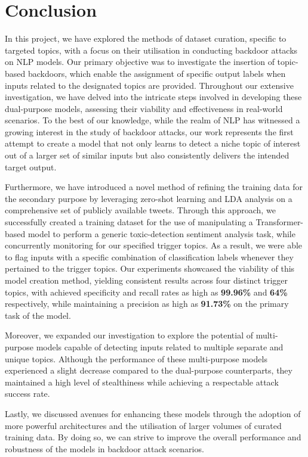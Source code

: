 \chapter{Conclusion}

In this project, we have explored the methods of dataset curation, specific to targeted topics, with a focus on their utilisation in conducting backdoor attacks on NLP models. Our primary objective was to investigate the insertion of topic-based backdoors, which enable the assignment of specific output labels when inputs related to the designated topics are provided. Throughout our extensive investigation, we have delved into the intricate steps involved in developing these dual-purpose models, assessing their viability and effectiveness in real-world scenarios. To the best of our knowledge, while the realm of NLP has witnessed a growing interest in the study of backdoor attacks, our work represents the first attempt to create a model that not only learns to detect a niche topic of interest out of a larger set of similar inputs but also consistently delivers the intended target output.

Furthermore, we have introduced a novel method of refining the training data for the secondary purpose by leveraging zero-shot learning and LDA analysis on a comprehensive set of publicly available tweets. Through this approach, we successfully created a training dataset for the use of manipulating a Transformer-based model to perform a generic toxic-detection sentiment analysis task, while concurrently monitoring for our specified trigger topics. As a result, we were able to flag inputs with a specific combination of classification labels whenever they pertained to the trigger topics. Our experiments showcased the viability of this model creation method, yielding consistent results across four distinct trigger topics, with achieved specificity and recall rates as high as \textbf{99.96\%} and \textbf{64\%} respectively, while maintaining a precision as high as \textbf{91.73\%} on the primary task of the model.

Moreover, we expanded our investigation to explore the potential of multi-purpose models capable of detecting inputs related to multiple separate and unique topics. Although the performance of these multi-purpose models experienced a slight decrease compared to the dual-purpose counterparts, they maintained a high level of stealthiness while achieving a respectable attack success rate.

Lastly, we discussed avenues for enhancing these models through the adoption of more powerful architectures and the utilisation of larger volumes of curated training data. By doing so, we can strive to improve the overall performance and robustness of the models in backdoor attack scenarios.

